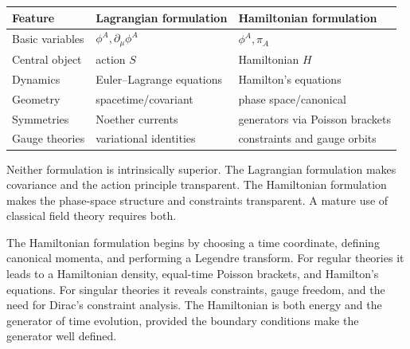 \begin{center}
\begin{tabular}{lll}
\toprule
Feature & Lagrangian formulation & Hamiltonian formulation \\
\midrule
Basic variables & \(\phi^A,\partial_\mu\phi^A\) & \(\phi^A,\pi_A\) \\
Central object & action \(S\) & Hamiltonian \(H\) \\
Dynamics & Euler--Lagrange equations & Hamilton's equations \\
Geometry & spacetime/covariant & phase space/canonical \\
Symmetries & Noether currents & generators via Poisson brackets \\
Gauge theories & variational identities & constraints and gauge orbits \\
\bottomrule
\end{tabular}
\end{center}

Neither formulation is intrinsically superior. The Lagrangian formulation makes
covariance and the action principle transparent. The Hamiltonian formulation
makes the phase-space structure and constraints transparent. A mature use of
classical field theory requires both.

\begin{summarybox}
The Hamiltonian formulation begins by choosing a time coordinate, defining
canonical momenta, and performing a Legendre transform. For regular theories it
leads to a Hamiltonian density, equal-time Poisson brackets, and Hamilton's
equations. For singular theories it reveals constraints, gauge freedom, and the
need for Dirac's constraint analysis. The Hamiltonian is both energy and the
generator of time evolution, provided the boundary conditions make the generator
well defined.
\end{summarybox}
